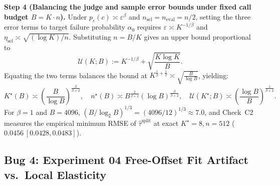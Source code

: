 \documentclass[11pt]{article}
\begin{document}
\textbf{Step 4 (Balancing the judge and sample error bounds under fixed call budget $B = K \cdot n$).}
Under $p_\varepsilon(c) \asymp \varepsilon^\beta$ and $n_{\mathrm{sel}} = n_{\mathrm{eval}} = n/2$, setting the three error terms to target failure probability $\alpha_0$ requires $\varepsilon \asymp K^{-1/\beta}$ and $\eta_{\mathrm{sel}} \asymp \sqrt{(\log K)/n}$. Substituting $n = B / K$ gives an upper bound proportional to
\begin{equation}
\mathcal{U}(K; B) := K^{-1/\beta} + \sqrt{\frac{K \log K}{B}}.
\end{equation}
Equating the two terms balances the bound at $K^{\frac{1}{\beta} + \frac{1}{2}} \asymp \sqrt{\frac{B}{\log B}}$, yielding:
\begin{equation}
\boxed{K^\star(B) \asymp \left(\frac{B}{\log B}\right)^{\frac{\beta}{\beta+2}}, \quad
n^\star(B) \asymp B^{\frac{2}{\beta+2}}(\log B)^{\frac{\beta}{\beta+2}}, \quad
\mathcal{U}(K^\star;B) \asymp \left(\frac{\log B}{B}\right)^{\frac{1}{\beta+2}}.}
\end{equation}
For $\beta = 1$ and $B = 4096$, $(B/\log_2 B)^{1/3} = (4096/12)^{1/3} \approx 7.0$, and Check~C2 measures the empirical minimum RMSE of $\hat{\tau}^{\mathrm{split}}$ at exact $K^\star = 8, n = 512$ ($0.0456~[0.0428, 0.0483]$).

\subsection{Bug 4: Experiment 04 Free-Offset Fit Artifact vs.\ Local Elasticity}
\label{sec:diversity_fix}
\end{document}
